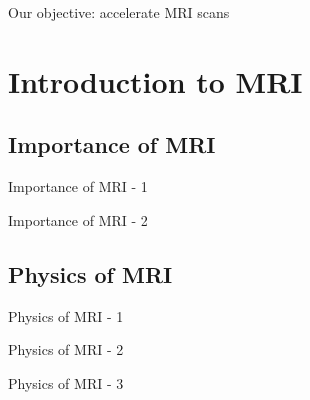 \documentclass[aspectratio=169,xcolor=dvipsnames]{beamer}
\begin{document}
\begin{frame}{Our objective: accelerate MRI scans}
    \begin{multicols}{2}
    \tableofcontents
    \end{multicols}
\end{frame}

\section{Introduction to MRI}
\subsection{Importance of MRI}
\begin{frame}{Importance of MRI - 1}
\end{frame}

\begin{frame}{Importance of MRI - 2}
\end{frame}

\subsection{Physics of MRI}
\begin{frame}{Physics of MRI - 1}
\end{frame}

\begin{frame}{Physics of MRI - 2}
\end{frame}

\begin{frame}{Physics of MRI - 3}
\end{frame}
\end{document}
